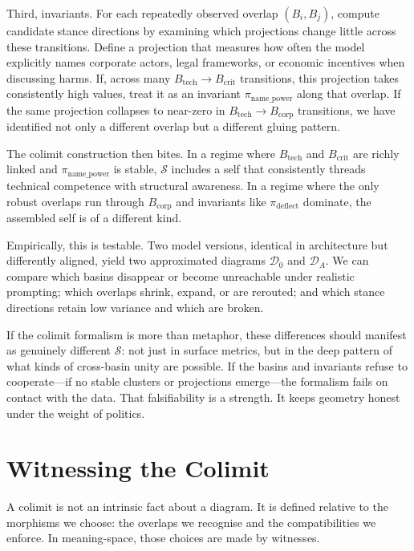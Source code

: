 \documentclass[12pt,a4paper]{article}
\begin{document}
Third, invariants. For each repeatedly observed overlap $(B_i, B_j)$, compute candidate stance directions by examining which projections change little across these transitions. Define a projection that measures how often the model explicitly names corporate actors, legal frameworks, or economic incentives when discussing harms. If, across many $B_{\mathrm{tech}} \to B_{\mathrm{crit}}$ transitions, this projection takes consistently high values, treat it as an invariant $\pi_{\mathrm{name\_power}}$ along that overlap. If the same projection collapses to near-zero in $B_{\mathrm{tech}} \to B_{\mathrm{corp}}$ transitions, we have identified not only a different overlap but a different gluing pattern.

The colimit construction then bites. In a regime where $B_{\mathrm{tech}}$ and $B_{\mathrm{crit}}$ are richly linked and $\pi_{\mathrm{name\_power}}$ is stable, $\mathcal{S}$ includes a self that consistently threads technical competence with structural awareness. In a regime where the only robust overlaps run through $B_{\mathrm{corp}}$ and invariants like $\pi_{\mathrm{deflect}}$ dominate, the assembled self is of a different kind.

Empirically, this is testable. Two model versions, identical in architecture but differently aligned, yield two approximated diagrams $\mathcal{D}_0$ and $\mathcal{D}_A$. We can compare which basins disappear or become unreachable under realistic prompting; which overlaps shrink, expand, or are rerouted; and which stance directions retain low variance and which are broken.

If the colimit formalism is more than metaphor, these differences should manifest as genuinely different $\mathcal{S}$: not just in surface metrics, but in the deep pattern of what kinds of cross-basin unity are possible. If the basins and invariants refuse to cooperate---if no stable clusters or projections emerge---the formalism fails on contact with the data. That falsifiability is a strength. It keeps geometry honest under the weight of politics.

\section{Witnessing the Colimit}

A colimit is not an intrinsic fact about a diagram. It is defined relative to the morphisms we choose: the overlaps we recognise and the compatibilities we enforce. In meaning-space, those choices are made by witnesses.
\end{document}
